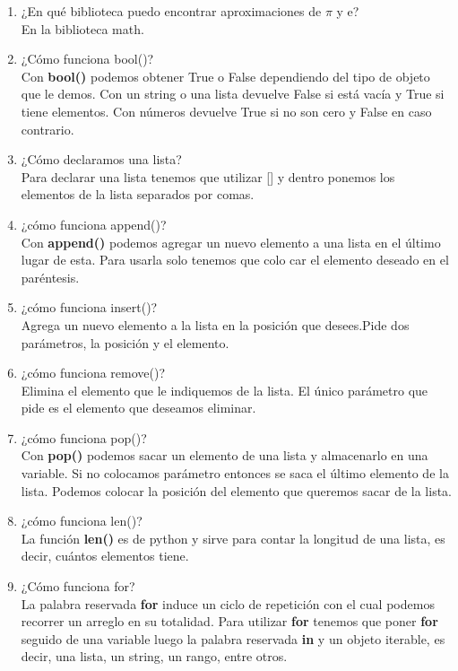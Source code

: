 \documentclass[letterpaper, 12pt, oneside]{article}%
\begin{document}
\begin{enumerate}
		\item ¿En qué biblioteca puedo encontrar aproximaciones de $\pi$ y e? \\ En la biblioteca math.
		\item ¿Cómo funciona bool()? \\ Con \textbf{bool()} podemos obtener True o False dependiendo del tipo de objeto que le demos. Con un string o una lista devuelve False si está vacía y True si tiene elementos. Con números devuelve True si no son cero y False en caso contrario.
		\item ¿Cómo declaramos una lista? \\ Para declarar una lista tenemos que utilizar [] y dentro ponemos los elementos de la lista separados por comas.
		\item ¿cómo funciona append()? \\ Con \textbf{append()} podemos agregar un  nuevo elemento a una lista en el último lugar de esta. Para usarla solo tenemos que colo car el elemento deseado en el paréntesis.
		\item ¿cómo funciona insert()? \\ Agrega un nuevo elemento a la lista en la posición que desees.Pide dos parámetros, la posición y el elemento.
		\item ¿cómo funciona remove()? \\ Elimina el elemento que le indiquemos de la lista. El único parámetro que pide es el elemento que deseamos eliminar.
		\item ¿cómo funciona pop()? \\ Con \textbf{pop()} podemos sacar un elemento de una lista y almacenarlo en una variable. Si no colocamos parámetro entonces se saca el último elemento de la lista. Podemos colocar la posición del elemento que queremos sacar de la lista.
		\item ¿cómo funciona len()? \\ La función \textbf{len()} es de python y sirve para contar la longitud de una lista, es decir, cuántos elementos tiene.
		\item ¿Cómo funciona for? \\ La palabra reservada \textbf{for} induce un ciclo de repetición con el cual podemos recorrer un arreglo en su totalidad. Para utilizar \textbf{for} tenemos que poner \textbf{for} seguido de una variable luego la palabra reservada \textbf{in} y un objeto iterable, es decir, una lista, un string, un rango, entre otros.
	\end{enumerate}
\end{document}
